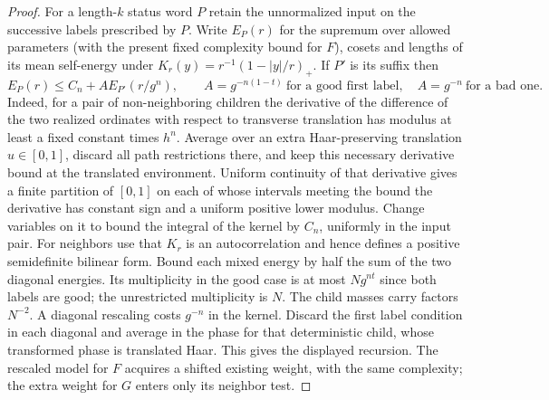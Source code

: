 \documentclass[11pt,a4paper]{article}
\begin{document}
\begin{proof}
For a length-$k$ status word $P$ retain the unnormalized input on the successive labels prescribed by $P$. Write $E_P(r)$ for the supremum over allowed parameters (with the present fixed complexity bound for $F$), cosets and lengths of its mean self-energy under $K_r(y)=r^{-1}(1-|y|/r)_+$. If $P'$ is its suffix then
\[
 E_P(r)\le C_n+A E_{P'}(r/g^n),\qquad
 A=g^{-n(1-t)}\ \text{for a good first label},\quad
 A=g^{-n}\ \text{for a bad one}.
\]
Indeed, for a pair of non-neighboring children the derivative of the difference of the two realized ordinates with respect to transverse translation has modulus at least a fixed constant times $h^n$. Average over an extra Haar-preserving translation $u\in[0,1]$, discard all path restrictions there, and keep this necessary derivative bound at the translated environment. Uniform continuity of that derivative gives a finite partition of $[0,1]$ on each of whose intervals meeting the bound the derivative has constant sign and a uniform positive lower modulus. Change variables on it to bound the integral of the kernel by $C_n$, uniformly in the input pair. For neighbors use that $K_r$ is an autocorrelation and hence defines a positive semidefinite bilinear form. Bound each mixed energy by half the sum of the two diagonal energies. Its multiplicity in the good case is at most $Ng^{nt}$ since both labels are good; the unrestricted multiplicity is $N$. The child masses carry factors $N^{-2}$. A diagonal rescaling costs $g^{-n}$ in the kernel. Discard the first label condition in each diagonal and average in the phase for that deterministic child, whose transformed phase is translated Haar. This gives the displayed recursion. The rescaled model for $F$ acquires a shifted existing weight, with the same complexity; the extra weight for $G$ enters only its neighbor test.


\end{proof}
\end{document}
